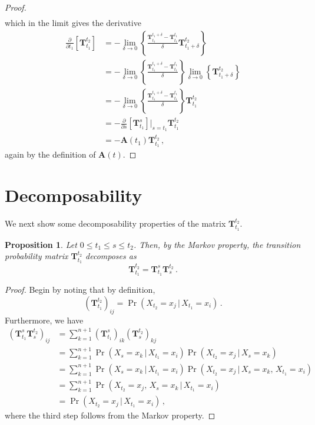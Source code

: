 \documentclass[10pt]{article}
\newtheorem{proposition}[theorem]{Proposition}
\begin{document}
\begin{proof}
\begin{align*}
\end{align*}
which in the limit gives the derivative
\begin{align*}
\frac{\partial}{\partial t_1}\left[\mathbf{T}_{t_1}^{t_2}\right] &= -\lim_{\delta\rightarrow 0}\left\{\frac{\mathbf{T}_{t_1}^{t_1+\delta} - \mathbf{T}_{t_1}^{t_1}}{\delta}\mathbf{T}_{t_1+\delta}^{t_2}\right\} \\
&= -\lim_{\delta\rightarrow 0}\left\{\frac{\mathbf{T}_{t_1}^{t_1+\delta} - \mathbf{T}_{t_1}^{t_1}}{\delta}\right\}\lim_{\delta\rightarrow 0}\left\{\mathbf{T}_{t_1+\delta}^{t_2}\right\} \\
&= -\lim_{\delta\rightarrow 0}\left\{\frac{\mathbf{T}_{t_1}^{t_1+\delta} - \mathbf{T}_{t_1}^{t_1}}{\delta}\right\}\mathbf{T}_{t_1}^{t_2} \\
&= -\frac{\partial}{\partial s}\left[\mathbf{T}_{t_1}^s\right]\Big\vert_{s=t_1}\mathbf{T}_{t_1}^{t_2} \\
&= -\mathbf{A}(t_1)\mathbf{T}_{t_1}^{t_2}\,,
\end{align*}
again by the definition of $\mathbf{A}(t)$.
\end{proof}

\section{Decomposability}

We next show some decomposability properties of the matrix $\mathbf{T}_{t_1}^{t_2}$.

\begin{proposition}
Let $0\leq t_1 \leq s \leq t_2$. Then, by the Markov property, the transition probability matrix $\mathbf{T}_{t_1}^{t_2}$ decomposes as
\begin{equation*}
\mathbf{T}_{t_1}^{t_2} = \mathbf{T}_{t_1}^{s}\mathbf{T}_{s}^{t_2}\,.
\end{equation*}
\end{proposition}
\begin{proof}
Begin by noting that by definition,
\begin{equation*}
\left(\mathbf{T}_{t_1}^{t_2}\right)_{ij} = \Pr(X_{t_2}=x_j\,\vert\,X_{t_1}=x_i)\,.
\end{equation*}
Furthermore, we have
\begin{align*}
\left(\mathbf{T}_{t_1}^{s}\mathbf{T}_{s}^{t_2}\right)_{ij} &= \sum_{k=1}^{n+1} \left(\mathbf{T}_{t_1}^{s}\right)_{ik}\left(\mathbf{T}_{s}^{t_2}\right)_{kj} \\
&= \sum_{k=1}^{n+1} \Pr(X_{s}=x_k\,\vert\,X_{t_1}=x_i)\Pr(X_{t_2}=x_j\,\vert\,X_{s}=x_k) \\
&= \sum_{k=1}^{n+1} \Pr(X_{s}=x_k\,\vert\,X_{t_1}=x_i)\Pr(X_{t_2}=x_j\,\vert\,X_{s}=x_k,\,X_{t_1}=x_i) \\
&= \sum_{k=1}^{n+1} \Pr(X_{t_2}=x_j,\,X_{s}=x_k\,\vert\,X_{t_1}=x_i) \\
&= \Pr(X_{t_2}=x_j\,\vert\,X_{t_1}=x_i)\,,
\end{align*}
where the third step follows from the Markov property.
\end{proof}
\end{document}
